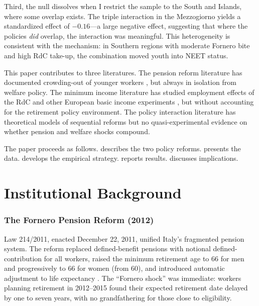 \documentclass[12pt]{article}
\begin{document}
Third, the null dissolves when I restrict the sample to the South and Islands, where some overlap exists. The triple interaction in the Mezzogiorno yields a standardized effect of $-0.16$---a large negative effect, suggesting that where the policies \emph{did} overlap, the interaction was meaningful. This heterogeneity is consistent with the mechanism: in Southern regions with moderate Fornero bite and high RdC take-up, the combination moved youth into NEET status.

This paper contributes to three literatures. The pension reform literature has documented crowding-out of younger workers \citep{boeri2022, bertoni2018, cataldi2012, moscarini2007}, but always in isolation from welfare policy. The minimum income literature has studied employment effects of the RdC \citep{ferrante2023, ferrara2022, ferrara2019, saraceno2019} and other European basic income experiments \citep{hoynes2016, marinescu2018}, but without accounting for the retirement policy environment. The policy interaction literature has theoretical models of sequential reforms \citep{acemoglu2015, blanchard2014} but no quasi-experimental evidence on whether pension and welfare shocks compound.

The paper proceeds as follows.  describes the two policy reforms.  presents the data.  develops the empirical strategy.  reports results.  discusses implications.


\section{Institutional Background}
\label{sec:background}

\subsubsection*{The Fornero Pension Reform (2012)} Law 214/2011, enacted December 22, 2011, unified Italy's fragmented pension system. The reform replaced defined-benefit pensions with notional defined-contribution for all workers, raised the minimum retirement age to 66 for men and progressively to 66 for women (from 60), and introduced automatic adjustment to life expectancy \citep{boeri2012}. The ``Fornero shock'' was immediate: workers planning retirement in 2012--2015 found their expected retirement date delayed by one to seven years, with no grandfathering for those close to eligibility.
\end{document}
